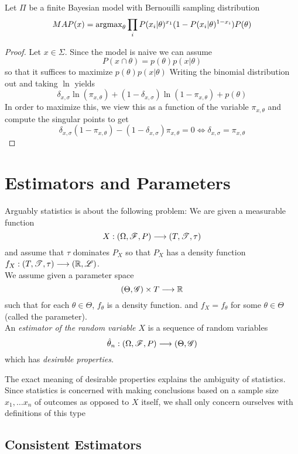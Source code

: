 \begin{lemma}
Let $\Pi$ be a finite Bayesian model with Bernouilli sampling distribution
\[
MAP(x)=\operatorname{argmax}_\theta \prod_i P(x_i\vert \theta)^{x_1}(1-P(x_i\vert \theta)^{1-x_i})P(\theta)
\]
\end{lemma}


\begin{proof}
Let $x \in \Sigma$. Since the model is naive we can assume
\[
P(x\cap \theta)=p(\theta)p(x\vert \theta)
\]	
so that it suffices to maximize $p(\theta)p(x\vert \theta)$
Writing the binomial distribution out and taking $\ln$ yields
\[
\delta_{x,\sigma}\ln(\pi_{x,\theta})+(1-\delta_{x,\sigma})\ln(1-\pi_{x,\theta})+p(\theta)
\]
In order to maximize this, we view this as a function of the variable $\pi_{x,\theta}$ and compute the singular points to get
\[
\delta_{x,\sigma}(1-\pi_{x,\theta})-(1-\delta_{x,\sigma})\pi_{x,\theta}=0\iff \delta_{x,\sigma}=\pi_{x,\theta}
\]

\end{proof}



\section{Estimators and Parameters}

Arguably statistics is about the following problem: We are given a measurable function
\[
X:(\Omega, \r{F}, P)\mor (T,\r{T},\tau)
\]
and assume that $\tau$ dominates $P_X$ so that $P_X$ has a density function $f_X: (T,\r{T},\tau) \mor (\d{R},\r{L})$.\\
We assume given a parameter space
\[
(\Theta, \r{G})\times T\mor \d{R}
\]
such that for each $\theta \in \Theta$, $f_\theta$ is a density function. and $f_X=f_\theta$ for some $\theta \in \Theta$ (called the parameter).\\
An \emph{estimator of the random variable $X$} is a sequence of random variables
\[
\hat{\theta}_n:(\Omega,\r{F},P)\mor (\Theta, \r{G})
\] 
which has \emph{desirable properties.}
\begin{center}
The exact meaning of desirable properties explains the ambiguity of statistics. Since statistics is concerned with making conclusions based on a sample size $x_1,\ldots x_n$ of outcomes as opposed to $X$ itself, we shall only concern ourselves with definitions of this type
\end{center}
 
 
\subsection{Consistent Estimators}

